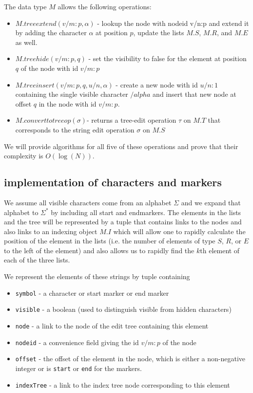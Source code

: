 \documentclass{amsart}
\begin{document}
The data type $M$ allows the following operations:
\begin{itemize}
\item $M.treeextend(v/m:p,\alpha)$ - lookup the node with nodeid v/n:p and extend it by adding the character $\alpha$ at position $p$, update the lists $M.S$, $M.R$, and $M.E$ as well.
\item $M.treehide(v/m:p,q)$ - set the visibility to false for the element at position $q$ of the node with id $v/m:p$
\item $M.treeinsert(v/m:p,q,u/n,\alpha)$ - create a new node with id $u/n:1$ containing the single visible character $/alpha$ and insert that new node at offset $q$ in the node with id $v/m:p$.
\item $M.converttotreeop(\sigma)$- returns a tree-edit operation $\tau$ on $M.T$ that corresponds to the string edit operation $\sigma$ on $M.S$
\end{itemize}
We will provide algorithms for all five of these operations and prove that their complexity is $O(\log(N))$.
\subsection{implementation of characters and markers}
We assume all visible characters come from an alphabet $\Sigma$
and we expand that alphabet to $\Sigma^*$ by including all start and endmarkers.
The elements in the lists and the tree will be represented by a tuple that contains links to the nodes and also links to an indexing object $M.I$ which will allow one to rapidly calculate the position of the element in the lists (i.e. the number of elements of type $S$, $R$, or $E$ to the left of the element) and also allows us to rapidly find the $k$th element of each of the three lists.

We represent the elements of these strings by tuple containing
\begin{itemize}
\item {\tt symbol} - a character or start marker or end marker 
\item {\tt visible} - a boolean (used to distinguish visible from hidden characters)
\item {\tt node} - a link to the node of the edit tree containing this element
\item {\tt nodeid} - a convenience field giving the id $v/m:p$ of the node
\item {\tt offset} - the offset of the element in the node, which is either a non-negative integer or is {\tt start} or {\tt end} for the markers.
\item {\tt indexTree} - a link to the index tree node corresponding to this element
\end{itemize}
\end{document}
